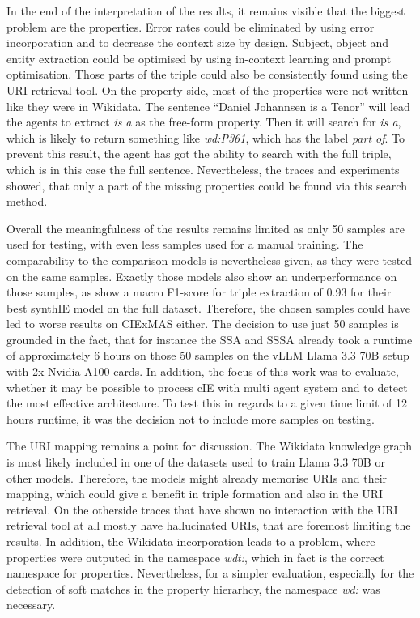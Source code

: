 \documentclass[a4paper,oneside,bibliography=totoc]{scrbook}
\begin{document}
In the end of the interpretation of the results, it remains visible that the biggest problem are the properties. Error rates could be eliminated by using error incorporation and to decrease the context size by design. Subject, object and entity extraction could be optimised by using in-context learning and prompt optimisation. Those parts of the triple could also be consistently found using the URI retrieval tool. On the property side, most of the properties were not written like they were in Wikidata. The sentence \enquote{Daniel Johannsen is a Tenor} will lead the agents to extract \textit{is a} as the free-form property. Then it will search for \textit{is a}, which is likely to return something like \textit{wd:P361}, which has the label \textit{part of}. To prevent this result, the agent has got the ability to search with the full triple, which is in this case the full sentence. Nevertheless, the traces and experiments showed, that only a part of the missing properties could be found via this search method.

Overall the meaningfulness of the results remains limited as only 50 samples are used for testing, with even less samples used for a manual training. The comparability to the comparison models is nevertheless given, as they were tested on the same samples. Exactly those models also show an underperformance on those samples, as \citet{Josifoski2023} show a macro F1-score for triple extraction of 0.93 for their best synthIE model on the full dataset. Therefore, the chosen samples could have led to worse results on CIExMAS either. The decision to use just 50 samples is grounded in the fact, that for instance the \ac{SSA} and \ac{SSSA} already took a runtime of approximately 6 hours on those 50 samples on the vLLM Llama 3.3 70B setup with 2x Nvidia A100 cards. In addition, the focus of this work was to evaluate, whether it may be possible to process \ac{cIE} with multi agent system and to detect the most effective architecture. To test this in regards to a given time limit of 12 hours runtime, it was the decision not to include more samples on testing.

The URI mapping remains a point for discussion. The Wikidata knowledge graph is most likely included in one of the datasets used to train Llama 3.3 70B or other models. Therefore, the models might already memorise URIs and their mapping, which could give a benefit in triple formation and also in the URI retrieval. On the otherside traces that have shown no interaction with the URI retrieval tool at all mostly have hallucinated URIs, that are foremost limiting the results. In addition, the Wikidata incorporation leads to a problem, where properties were outputed in the namespace \textit{wdt:}, which in fact is the correct namespace for properties. Nevertheless, for a simpler evaluation, especially for the detection of soft matches in the property hierarhcy, the namespace \textit{wd:} was necessary.
\end{document}
